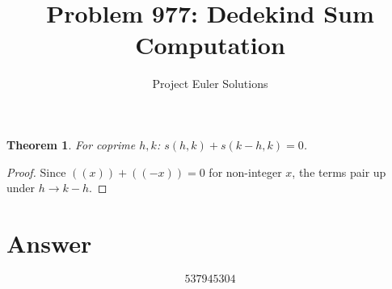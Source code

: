 \documentclass[11pt]{article}
\title{Problem 977: Dedekind Sum Computation}
\author{Project Euler Solutions}
\date{}
\newtheorem{theorem}{Theorem}
\begin{document}
\maketitle
\begin{theorem}
For coprime $h,k$: $s(h,k) + s(k-h,k) = 0$.
\end{theorem}
\begin{proof}
Since $((x)) + ((-x)) = 0$ for non-integer $x$, the terms pair up under $h \to k-h$.
\end{proof}
\section{Answer}

\[
\boxed{537945304}
\]
\end{document}

